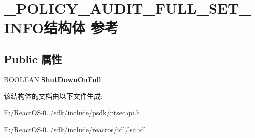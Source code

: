 \hypertarget{struct___p_o_l_i_c_y___a_u_d_i_t___f_u_l_l___s_e_t___i_n_f_o}{}\section{\+\_\+\+P\+O\+L\+I\+C\+Y\+\_\+\+A\+U\+D\+I\+T\+\_\+\+F\+U\+L\+L\+\_\+\+S\+E\+T\+\_\+\+I\+N\+F\+O结构体 参考}
\label{struct___p_o_l_i_c_y___a_u_d_i_t___f_u_l_l___s_e_t___i_n_f_o}
\subsection*{Public 属性}
\begin{DoxyCompactItemize}
\item 
\mbox{\label{struct___p_o_l_i_c_y___a_u_d_i_t___f_u_l_l___s_e_t___i_n_f_o_a3d1e3cd6733e89f6bfad9a3def319253}} 
\hyperlink{_processor_bind_8h_a112e3146cb38b6ee95e64d85842e380a}{B\+O\+O\+L\+E\+AN} {\bfseries Shut\+Down\+On\+Full}
\end{DoxyCompactItemize}


该结构体的文档由以下文件生成\+:\begin{DoxyCompactItemize}
\item 
E\+:/\+React\+O\+S-\/0../sdk/include/psdk/ntsecapi.\+h\item 
E\+:/\+React\+O\+S-\/0../sdk/include/reactos/idl/lsa.\+idl\end{DoxyCompactItemize}
